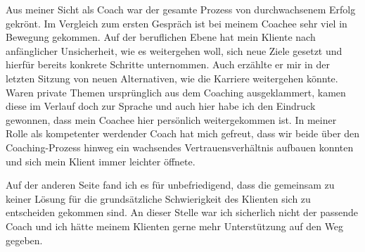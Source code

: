 \documentclass[11pt,a4paper]{article}
\begin{document}
Aus meiner Sicht als Coach war der gesamte Prozess von durchwachsenem Erfolg gekrönt. Im Vergleich zum ersten Gespräch ist bei meinem Coachee sehr viel in Bewegung gekommen. Auf der beruflichen Ebene hat mein Kliente nach anfänglicher Unsicherheit, wie es weitergehen woll, sich neue Ziele gesetzt und hierfür bereits konkrete Schritte unternommen. Auch erzählte er mir in der letzten Sitzung von neuen Alternativen, wie die Karriere weitergehen könnte. Waren private Themen ursprünglich aus dem Coaching ausgeklammert, kamen diese im Verlauf doch zur Sprache und auch hier habe ich den Eindruck gewonnen, dass mein Coachee hier persönlich weitergekommen ist. In meiner Rolle als kompetenter werdender Coach hat mich gefreut, dass wir beide über den Coaching-Prozess hinweg ein wachsendes Vertrauensverhältnis aufbauen konnten und sich mein Klient immer leichter öffnete. 

Auf der anderen Seite fand ich es für unbefriedigend, dass die gemeinsam zu keiner Lösung für die grundsätzliche Schwierigkeit des Klienten sich zu entscheiden gekommen sind. An dieser Stelle war ich sicherlich nicht der passende Coach und ich hätte meinem Klienten gerne mehr Unterstützung auf den Weg gegeben.
\end{document}
